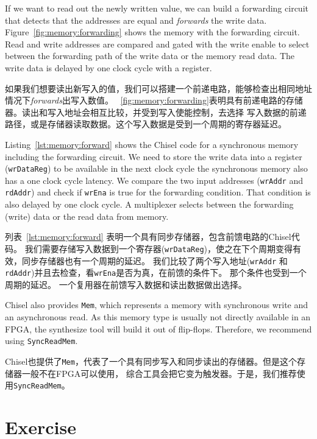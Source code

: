 \documentclass[%
    10pt,
    headinclude, footexclude,
    openright, %
    notitlepage,
    cleardoubleempty,
    headsepline,
    pointlessnumbers,
    bibtotoc, idxtotoc,
    ]{scrbook}
\newcommand{\code}[1]{{\small{\texttt{#1}}}}
\begin{document}
If we want to read out the newly written value, we can build a forwarding
circuit that detects that the addresses are equal and \emph{forwards} the
write data. Figure~\ref{fig:memory:forwarding} shows the memory with
the forwarding circuit. Read and write addresses are compared and gated with
the write enable to select between the forwarding path of the write data or the
memory read data. The write data is delayed by one clock cycle with a register.

如果我们想要读出新写入的值，我们可以搭建一个前递电路，能够检查出相同地址情况下\emph{forwards}出写入数值。
~\ref{fig:memory:forwarding}表明具有前递电路的存储器。读出和写入地址会相互比较，并受到写入使能控制，去选择
写入数据的前递路径，或是存储器读取数据。这个写入数据是受到一个周期的寄存器延迟。

Listing~\ref{lst:memory:forward} shows the Chisel code for a synchronous memory
including the forwarding circuit. We need to store the write data into a register
(\code{wrDataReg}) to be available in the next clock cycle the synchronous
memory also has a one clock cycle latency.
We compare the two input addresses (\code{wrAddr} and \code{rdAddr})
and check if \code{wrEna} is true for the forwarding condition.
That condition is also delayed by one clock cycle.
A multiplexer selects between the forwarding (write) data or the read
data from memory.

列表~\ref{lst:memory:forward} 表明一个具有同步存储器，包含前馈电路的Chisel代码。
我们需要存储写入数据到一个寄存器(\code{wrDataReg})，使之在下个周期变得有效，同步存储器也有一个周期的延迟。
我们比较了两个写入地址(\code{wrAddr} 和 \code{rdAddr})并且去检查，看\code{wrEna}是否为真，在前馈的条件下。
那个条件也受到一个周期的延迟。
一个复用器在前馈写入数据和读出数据做出选择。


Chisel also provides \code{Mem}, which represents a memory with synchronous
write and an asynchronous read. As this memory type is usually not directly available
in an FPGA, the synthesize tool will build it out of flip-flops.
Therefore, we recommend using \code{SyncReadMem}.

Chisel也提供了\code{Mem}，代表了一个具有同步写入和同步读出的存储器。但是这个存储器一般不在FPGA可以使用，
综合工具会把它变为触发器。于是，我们推荐使用\code{SyncReadMem}。

\section{Exercise}
\end{document}
